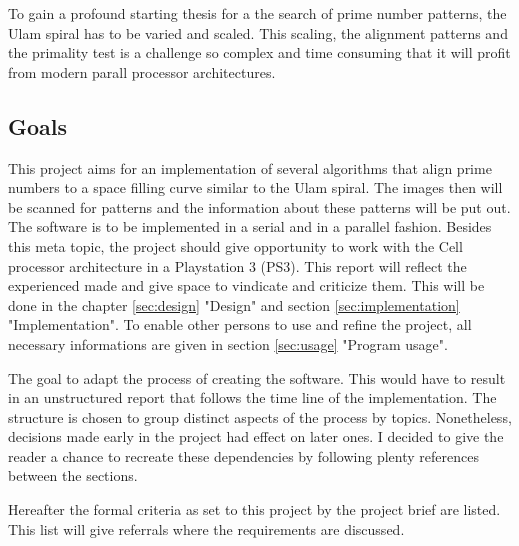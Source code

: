 \begin{figure}[H]
\begin{minipage}[t]{0.475\textwidth}
\centering
\end{minipage}
\hfill
\begin{minipage}[t]{0.475\textwidth}
\centering
\end{minipage}
\end{figure}

To gain a profound starting thesis for a the search of prime number patterns, the Ulam spiral has to be varied and scaled. This scaling, the alignment patterns and the primality test is a challenge so complex and time consuming that it will profit from modern parall processor architectures.
 
\subsection{Goals}

This project aims for an implementation of several algorithms that align prime numbers to a space filling curve similar to the Ulam spiral. The images then will be scanned for patterns and the information about these patterns will be put out. The software is to be implemented in a serial and in a parallel fashion. 
Besides this meta topic, the project should give opportunity to work with the Cell processor architecture in a Playstation 3 (PS3). This report will reflect the experienced made and give space to vindicate and criticize them. This will be done in the chapter \ref{sec:design} "Design" and section \ref{sec:implementation} "Implementation". To enable other persons to use and refine the project, all necessary informations are given in section \ref{sec:usage} "Program usage".

The goal to adapt the process of creating the software. This would have to result in an unstructured report that follows the time line of the implementation. The structure is chosen to group distinct aspects of the process by topics. Nonetheless, decisions made early in the project had effect on later ones. I decided to give the reader a chance to recreate these dependencies by following plenty references between the sections.

Hereafter the formal criteria as set to this project by the project brief are listed. This list will give referrals where the requirements are discussed.

